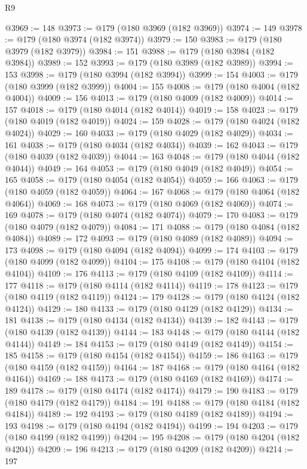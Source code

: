 \begin{lexlean}{R9}
\begin{coremodule}
{{{{{{{{{{{{{{{{{{{{{{{{{{{{{{{{{{{{{{{{{{{{{{{{{{{{{{{{{{{{{{{{{{{{{{{{{{{{{{{{{{{{@3969 := 148
@3973 := @179 (@180 @3969 (@182 @3969))
@3974 := 149
@3978 := @179 (@180 @3974 (@182 @3974))
@3979 := 150
@3983 := @179 (@180 @3979 (@182 @3979))
@3984 := 151
@3988 := @179 (@180 @3984 (@182 @3984))
@3989 := 152
@3993 := @179 (@180 @3989 (@182 @3989))
@3994 := 153
@3998 := @179 (@180 @3994 (@182 @3994))
@3999 := 154
@4003 := @179 (@180 @3999 (@182 @3999))
@4004 := 155
@4008 := @179 (@180 @4004 (@182 @4004))
@4009 := 156
@4013 := @179 (@180 @4009 (@182 @4009))
@4014 := 157
@4018 := @179 (@180 @4014 (@182 @4014))
@4019 := 158
@4023 := @179 (@180 @4019 (@182 @4019))
@4024 := 159
@4028 := @179 (@180 @4024 (@182 @4024))
@4029 := 160
@4033 := @179 (@180 @4029 (@182 @4029))
@4034 := 161
@4038 := @179 (@180 @4034 (@182 @4034))
@4039 := 162
@4043 := @179 (@180 @4039 (@182 @4039))
@4044 := 163
@4048 := @179 (@180 @4044 (@182 @4044))
@4049 := 164
@4053 := @179 (@180 @4049 (@182 @4049))
@4054 := 165
@4058 := @179 (@180 @4054 (@182 @4054))
@4059 := 166
@4063 := @179 (@180 @4059 (@182 @4059))
@4064 := 167
@4068 := @179 (@180 @4064 (@182 @4064))
@4069 := 168
@4073 := @179 (@180 @4069 (@182 @4069))
@4074 := 169
@4078 := @179 (@180 @4074 (@182 @4074))
@4079 := 170
@4083 := @179 (@180 @4079 (@182 @4079))
@4084 := 171
@4088 := @179 (@180 @4084 (@182 @4084))
@4089 := 172
@4093 := @179 (@180 @4089 (@182 @4089))
@4094 := 173
@4098 := @179 (@180 @4094 (@182 @4094))
@4099 := 174
@4103 := @179 (@180 @4099 (@182 @4099))
@4104 := 175
@4108 := @179 (@180 @4104 (@182 @4104))
@4109 := 176
@4113 := @179 (@180 @4109 (@182 @4109))
@4114 := 177
@4118 := @179 (@180 @4114 (@182 @4114))
@4119 := 178
@4123 := @179 (@180 @4119 (@182 @4119))
@4124 := 179
@4128 := @179 (@180 @4124 (@182 @4124))
@4129 := 180
@4133 := @179 (@180 @4129 (@182 @4129))
@4134 := 181
@4138 := @179 (@180 @4134 (@182 @4134))
@4139 := 182
@4143 := @179 (@180 @4139 (@182 @4139))
@4144 := 183
@4148 := @179 (@180 @4144 (@182 @4144))
@4149 := 184
@4153 := @179 (@180 @4149 (@182 @4149))
@4154 := 185
@4158 := @179 (@180 @4154 (@182 @4154))
@4159 := 186
@4163 := @179 (@180 @4159 (@182 @4159))
@4164 := 187
@4168 := @179 (@180 @4164 (@182 @4164))
@4169 := 188
@4173 := @179 (@180 @4169 (@182 @4169))
@4174 := 189
@4178 := @179 (@180 @4174 (@182 @4174))
@4179 := 190
@4183 := @179 (@180 @4179 (@182 @4179))
@4184 := 191
@4188 := @179 (@180 @4184 (@182 @4184))
@4189 := 192
@4193 := @179 (@180 @4189 (@182 @4189))
@4194 := 193
@4198 := @179 (@180 @4194 (@182 @4194))
@4199 := 194
@4203 := @179 (@180 @4199 (@182 @4199))
@4204 := 195
@4208 := @179 (@180 @4204 (@182 @4204))
@4209 := 196
@4213 := @179 (@180 @4209 (@182 @4209))
@4214 := 197
}}}}}}}}}}}}}}}}}}}}}}}}}}}}}}}}}}}}}}}}}}}}}}}}}}}}}}}}}}}}}}}}}}}}}}}}}}}}}}}}}}}}
\end{coremodule}
\end{lexlean}
